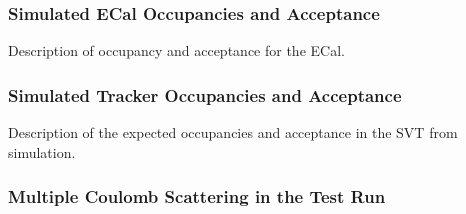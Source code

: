 
\subsubsection{Simulated ECal Occupancies and Acceptance}
Description of occupancy and acceptance for the ECal.

\subsubsection{Simulated Tracker Occupancies and Acceptance}
Description of the expected occupancies and acceptance in the SVT from simulation.

\subsubsection{Multiple Coulomb Scattering in the Test Run}


